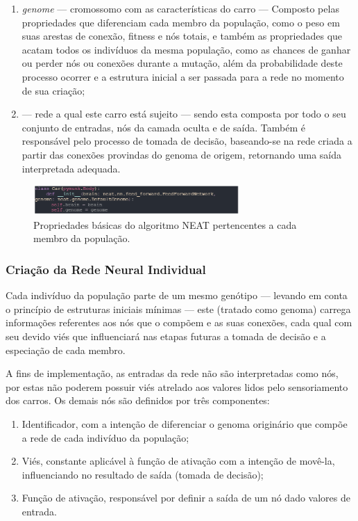\begin{enumerate}
	\item \textit{genome} — cromossomo com as características do carro — Composto pelas propriedades que diferenciam cada membro da população, como o peso em suas arestas de conexão, fitness e nós totais, e também as propriedades que acatam todos os indivíduos da mesma população, como as chances de ganhar ou perder nós ou conexões durante a mutação, além da probabilidade deste processo ocorrer e a estrutura inicial a ser passada para a rede no momento de sua criação; 
	\item {} —  rede a qual este carro está sujeito — sendo esta composta por todo o seu conjunto de entradas, nós da camada oculta e de saída. Também é responsável pelo processo de tomada de decisão, baseando-se na rede criada a partir das conexões provindas do genoma de origem, retornando uma saída interpretada adequada.
\end{enumerate}

\begin{figure}[htb]
        \centering
        \caption{\label{fig_DA}Propriedades básicas do algoritmo NEAT pertencentes a cada membro da população.}
        \includegraphics[width=0.7\textwidth]{images/DA.png}
\end{figure}

\subsubsection{Criação da Rede Neural Individual}
Cada indivíduo da população parte de um mesmo genótipo — levando em conta o princípio de estruturas iniciais mínimas — este (tratado como genoma) carrega informações referentes aos nós que o compõem e as suas conexões, cada qual com seu devido viés que influenciará nas etapas futuras a tomada de decisão e a especiação de cada membro.

A fins de implementação, as entradas da rede não são interpretadas como nós, por estas não poderem possuir viés atrelado aos valores lidos pelo sensoriamento dos carros. Os demais nós são definidos por três componentes: 

\begin{enumerate}
	\item Identificador, com a intenção de diferenciar o genoma originário que compõe a rede de cada indivíduo da população;
	\item Viés, constante aplicável à função de ativação com a intenção de movê-la, influenciando no resultado de saída (tomada de decisão);
	\item Função de ativação, responsável por definir a saída de um nó dado valores de entrada.
\end{enumerate}

